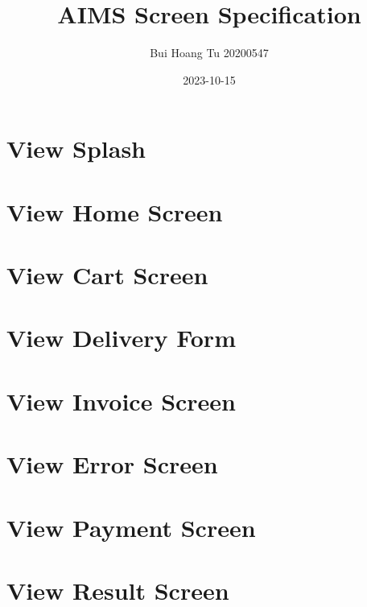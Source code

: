 \documentclass[letterpaper]{report}
\title{AIMS Screen Specification}
\author{Bui Hoang Tu 20200547}
\date{2023-10-15}
\begin{document}
    \maketitle
    
    \section{View Splash}
    

    \section{View Home Screen}
    

    \section{View Cart Screen}
    

    \section{View Delivery Form}    
    

    \section{View Invoice Screen}
    

    \section{View Error Screen}
    

    \section{View Payment Screen}
    

    \section{View Result Screen}
    
\end{document}
